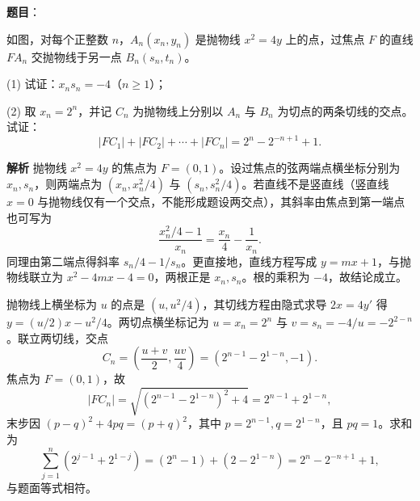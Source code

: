 \begin{answer}

\textbf{题目}：

如图，对每个正整数 \(n\)，\(A_n(x_n,y_n)\) 是抛物线 \(x^2=4y\) 上的点，过焦点 \(F\) 的直线 \(FA_n\) 交抛物线于另一点 \(B_n(s_n,t_n)\)。

(1) 试证：\(x_ns_n=-4\)（\(n\geqslant1\)）；

(2) 取 \(x_n=2^n\)，并记 \(C_n\) 为抛物线上分别以 \(A_n\) 与 \(B_n\) 为切点的两条切线的交点。试证：
\nopagebreak[4]
\[
|FC_1|+|FC_2|+\cdots+|FC_n|=2^n-2^{-n+1}+1.
\]
\nopagebreak[4]
\begin{center}\end{center}
\nopagebreak[4]
\textbf{解析}
抛物线 \(x^2=4y\) 的焦点为 \(F=(0,1)\)。设过焦点的弦两端点横坐标分别为 \(x_n,s_n\)，则两端点为 \((x_n,x_n^2/4)\) 与 \((s_n,s_n^2/4)\)。若直线不是竖直线（竖直线 \(x=0\) 与抛物线仅有一个交点，不能形成题设两交点），其斜率由焦点到第一端点也可写为
\nopagebreak[4]
\[
\frac{x_n^2/4-1}{x_n}=\frac{x_n}{4}-\frac1{x_n}.
\]
同理由第二端点得斜率 \(s_n/4-1/s_n\)。更直接地，直线方程写成 \(y=mx+1\)，与抛物线联立为 \(x^2-4mx-4=0\)，两根正是 \(x_n,s_n\)。根的乘积为 \(-4\)，故结论成立。

抛物线上横坐标为 \(u\) 的点是 \((u,u^2/4)\)，其切线方程由隐式求导 \(2x=4y'\) 得 \(y=(u/2)x-u^2/4\)。两切点横坐标记为 \(u=x_n=2^n\) 与 \(v=s_n=-4/u=-2^{2-n}\)。联立两切线，交点
\nopagebreak[4]
\[
C_n=\left(\frac{u+v}{2},\frac{uv}{4}\right)
=\left(2^{n-1}-2^{1-n},-1\right).
\]
焦点为 \(F=(0,1)\)，故
\nopagebreak[4]
\[
|FC_n|=\sqrt{(2^{n-1}-2^{1-n})^2+4}
=2^{n-1}+2^{1-n},
\]
末步因 \((p-q)^2+4pq=(p+q)^2\)，其中 \(p=2^{n-1},q=2^{1-n}\)，且 \(pq=1\)。求和为
\nopagebreak[4]
\[
\sum_{j=1}^n(2^{j-1}+2^{1-j})=(2^n-1)+(2-2^{1-n})
=2^n-2^{-n+1}+1,
\]
与题面等式相符。



\end{answer}